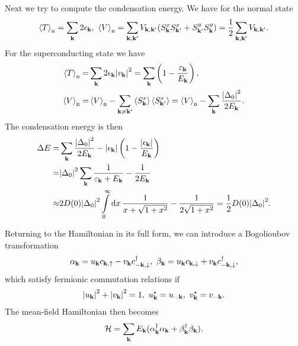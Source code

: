 Next we try to compute the condensation energy. We have for the normal state
\begin{align*}
	\expval{T}_{\text{n}} = \sum\limits_{\vb{k}}2\epsilon_{\vb{k}},\ \expval{V}_{\text{n}} = \sum\limits_{\vb{k}, \vb{k}\p}V_{\vb{k}, \vb{k}\p}(S_{\vb{k}}^{x}S_{\vb{k}\p}^{x} + S_{\vb{k}\p}^{y}S_{\vb{k}}^{y}) = \frac{1}{2}\sum\limits_{\vb{k}, \vb{k}\p}V_{\vb{k}, \vb{k}\p}.
\end{align*}
For the superconducting state we have
\begin{align*}
	\expval{T}_{\text{n}} =& \sum\limits_{\vb{k}}2\epsilon_{\vb{k}}\abs{v_{\vb{k}}}^{2} = \sum\limits_{\vb{k}}\left(1 - \frac{\varepsilon_{\vb{k}}}{E_{\vb{k}}}\right), \\
	\expval{V}_{\text{n}} =& \expval{V}_{\text{n}} - \sum\limits_{\vb{k} \neq \vb{k}^{\prime}}\expval{S_{\vb{k}}^{x}}\expval{S_{\vb{k}\ensuremath{^{\prime}}}^{x}} = \expval{V}_{\text{n}} - \sum\limits_{\vb{k}}\frac{\abs{\Delta_{0}}^{2}}{2E_{\vb{k}}}.
\end{align*}
The condensation energy is then
\begin{align*}
	\Delta E =& \sum\limits_{\vb{k}}\frac{\abs{\Delta_{0}}^{2}}{2E_{\vb{k}}} - \abs{\epsilon_{\vb{k}}}\left(1 - \frac{\abs{\epsilon_{\vb{k}}}}{E_{\vb{k}}}\right) \\
	         =& \abs{\Delta_{0}}^{2}\sum\limits_{\vb{k}}\frac{1}{\varepsilon_{\vb{k}} + E_{\vb{k}}} - \frac{1}{2E_{\vb{k}}} \\
	   \approx& 2D(0)\abs{\Delta_{0}}^{2}\int\limits_{0}^{\infty}\dd{x}\frac{1}{x + \sqrt{1 + x^{2}}} - \frac{1}{2\sqrt{1 + x^{2}}} = \frac{1}{2}D(0)\abs{\Delta_{0}}^{2}.
\end{align*}

Returning to the Hamiltonian in its full form, we can introduce a Bogolioubov transformation
\begin{align*}
	\alpha_{\vb{k}} = u_{\vb{k}}c_{\vb{k}, \uparrow} - v_{\vb{k}}c_{-\vb{k}, \downarrow}^{\dagger},\ \beta_{\vb{k}} = u_{\vb{k}}c_{\vb{k}, \downarrow} + v_{\vb{k}}c_{-\vb{k}, \downarrow}^{\dagger},
\end{align*}
which satisfy fermionic commutation relations if
\begin{align*}
	\abs{u_{\vb{k}}}^{2} + \abs{v_{\vb{k}}}^{2} = 1,\ u_{\vb{k}}^{\star} = u_{-\vb{k}},\ v_{\vb{k}}^{\star} = v_{-\vb{k}}.
\end{align*}
The mean-field Hamiltonian then becomes
\begin{align*}
	\mathcal{H} = \sum\limits_{\vb{k}}E_{\vb{k}}(\alpha_{\vb{k}}^{\dagger}\alpha_{\vb{k}} + \beta_{\vb{k}}^{\dagger}\beta_{\vb{k}}).
\end{align*}


